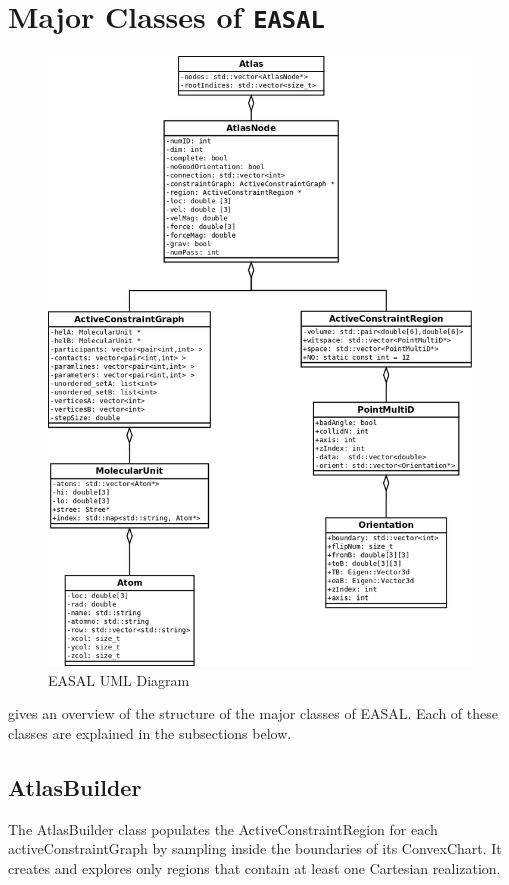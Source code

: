 \section{Major Classes of \texttt{EASAL}}
\label{sec:classes}
\begin{figure}[h]
\centering
\includegraphics[scale=0.3] {fig/EASAL_UML.png}
\caption{EASAL UML Diagram}
\label{UML}
\end{figure}


 gives an overview of the structure of the major classes of EASAL.
Each of these classes are explained in the subsections below.

\subsection{AtlasBuilder} 

The AtlasBuilder class populates the ActiveConstraintRegion for each
activeConstraintGraph by sampling inside the boundaries of its ConvexChart. 
It creates and explores only regions that contain at least one Cartesian
realization. 

